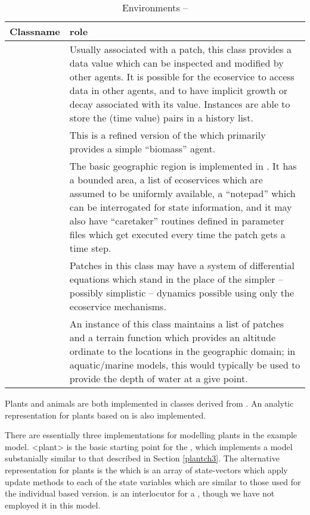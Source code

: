 \begin{table}[H]
\begin{center}
\caption{Environments -- \label{classtable4}}
\begin{tabular}{l L{7cm}}
\toprule
\textbf{Classname} & \textbf{role} \\
\midrule
{} & Usually associated with a patch, this class
provides a data value which can be inspected and modified by other
agents.  It is possible for the ecoservice to access data in other
agents, and to have implicit growth or decay associated with its
value.  Instances are able to store the (time value) pairs in a
history list.\\
 & This is a refined version of
the  which primarily provides a simple ``biomass''
agent.\\
 & The basic geographic region is implemented in
. It has a bounded area,  a list of ecoservices which
are assumed to be uniformly available, a ``notepad'' which can be
interrogated for state information, and it may also have ``caretaker''
routines defined in parameter files which get executed every time the
patch gets a time step.\\
 & Patches  in this class may have a system of
differential equations which stand in the place of the simpler --
possibly simplistic -- dynamics possible using only the ecoservice
mechanisms.\\
 & An instance of this class maintains a list of
patches and a terrain function which provides an altitude ordinate to
the locations in the geographic domain; in aquatic/marine models, this
would typically be used to provide the depth of water at a give point.\\
\bottomrule
\end{tabular}
\end{center}
\end{table}


Plants and animals are both implemented in classes derived
from . An analytic representation for plants
based on  is also implemented.

There are essentially three implementations for modelling plants in
the example model. \mclass<plant> is the basic starting point for
the , which implements a model substanially
similar to that described in Section \ref{plantch3}. The alternative
representation for plants is the  which is an
array of state-vectors which apply update methods to each of the state
variables which are similar to those used for the individual based
version.  is an interlocutor for
a , though we have not employed it in this model.\\

